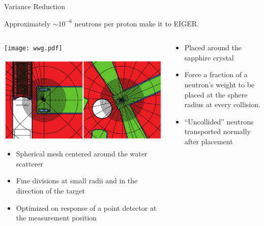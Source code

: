 \documentclass[final,t]{beamer}
\begin{document}
\begin{frame}{}
\begin{columns}[t]
\begin{column}{.3\linewidth}

      \begin{block}{Variance Reduction}

      \begin{center} Approximately $\sim 10^{-6}$ neutrons per proton make it to EIGER. \end{center}

      \begin{columns}

      \begin{column}{0.5\linewidth}

      \begin{center}
      \texttt{[image: wwg.pdf]}

      \includegraphics*[width=\linewidth]{wwg_mesh.pdf}
      \end{center}

      \begin{itemize}
      \item Spherical mesh centered around the water scatterer 
      \item Fine divisions at small radii and in the direction of the target 
      \item Optimized on response of a point detector at the measurement position
      \end{itemize}

      \end{column}


      \begin{column}{0.5\linewidth}

      \begin{itemize}
      \item Placed around the sapphire crystal 
      \item Force a fraction of a neutron's weight to be placed at the sphere radius at every collision.
      \item ``Uncollided'' neutrons transported normally after placement \cite{mcnpx270}
      \end{itemize}


\end{column}
\end{columns}
\end{block}
\end{column}
\end{columns}
\end{frame}
\end{document}
